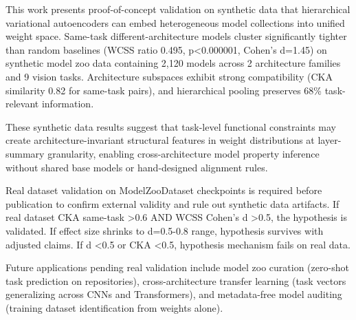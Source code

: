 
This work presents proof-of-concept validation on synthetic data that hierarchical variational autoencoders can embed heterogeneous model collections into unified weight space. Same-task different-architecture models cluster significantly tighter than random baselines (WCSS ratio 0.495, p<0.000001, Cohen's d=1.45) on synthetic model zoo data containing 2,120 models across 2 architecture families and 9 vision tasks. Architecture subspaces exhibit strong compatibility (CKA similarity 0.82 for same-task pairs), and hierarchical pooling preserves 68\% task-relevant information.

These synthetic data results suggest that task-level functional constraints may create architecture-invariant structural features in weight distributions at layer-summary granularity, enabling cross-architecture model property inference without shared base models or hand-designed alignment rules.

Real dataset validation on ModelZooDataset checkpoints is required before publication to confirm external validity and rule out synthetic data artifacts. If real dataset CKA same-task >0.6 AND WCSS Cohen's d >0.5, the hypothesis is validated. If effect size shrinks to d=0.5-0.8 range, hypothesis survives with adjusted claims. If d <0.5 or CKA <0.5, hypothesis mechanism fails on real data.

Future applications pending real validation include model zoo curation (zero-shot task prediction on repositories), cross-architecture transfer learning (task vectors generalizing across CNNs and Transformers), and metadata-free model auditing (training dataset identification from weights alone).

